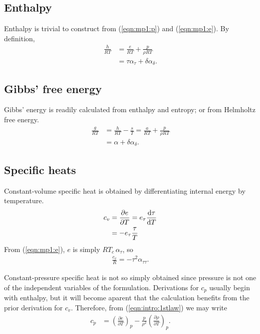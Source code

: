 \subsection{Enthalpy}\label{sec:mp1:h}

Enthalpy is trivial to construct from (\ref{eqn:mp1:p}) and (\ref{eqn:mp1:e}).  By definition, 
\begin{align}
\frac{h}{R T} &= \frac{e}{RT} + \frac{p}{\rho R T}\nonumber\\
 &= \tau \alpha_\tau + \delta \alpha_\delta.\label{eqn:mp1:h}
\end{align}

\subsection{Gibbs' free energy}\label{sec:mp1:g}

Gibbs' energy is readily calculated from enthalpy and entropy; or from Helmholtz free energy.
\begin{align}
\frac{g}{R T} &= \frac{h}{RT} - \frac{s}{T} = \frac{a}{RT} + \frac{p}{\rho RT}\nonumber\\
&= \alpha + \delta \alpha_\delta.
\end{align}

\subsection{Specific heats}\label{sec:mp1:c}

Constant-volume specific heat is obtained by differentiating internal energy by temperature.
\begin{align*}
c_v &= \frac{\partial e}{\partial T} = e_\tau \frac{\mathrm{d} \tau}{\mathrm{d} T}\\
 &= -e_\tau \frac{\tau}{T}
\end{align*}
From (\ref{eqn:mp1:e}), $e$ is simply $R T_c \, \alpha_\tau$, so
\begin{align}
\frac{c_v}{R} = - \tau^2 \alpha_{\tau\tau}\label{eqn:mp1:cv}.
\end{align}

Constant-pressure specific heat is not so simply obtained since pressure is not one of the independent variables of the formulation.  Derivations for $c_p$ usually begin with enthalpy, but it will become aparent that the calculation benefits from the prior derivation for $c_v$.  Therefore, from (\ref{eqn:intro:1stlaw}) we may write
\begin{align*}
c_p &= \left(\frac{\partial e}{\partial T}\right)_p - \frac{p}{\rho^2} \left(\frac{\partial \rho}{\partial T}\right)_p.
\end{align*}

